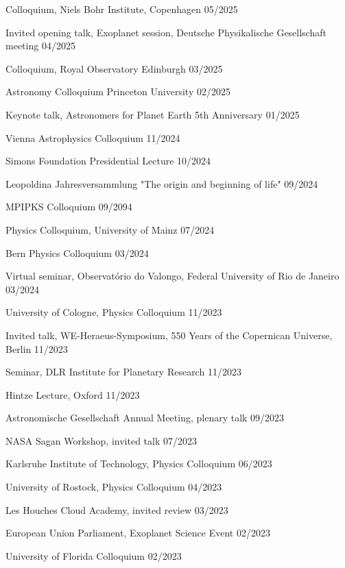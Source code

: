 \documentclass[12pt,letterpaper]{article}
\begin{document}
\begin{list}{}{\cvlist}
\item {Colloquium, Niels Bohr Institute, Copenhagen \hfill 05/2025}
\item {Invited opening talk, Exoplanet session, Deutsche Physikalische Gesellschaft meeting \hfill 04/2025}
\item {Colloquium, Royal Observatory Edinburgh \hfill 03/2025}
\item {Astronomy Colloquium Princeton University \hfill 02/2025}
\item {Keynote talk, Astronomers for Planet Earth 5th Anniversary \hfill 01/2025}
\item {Vienna Astrophysics Colloquium \hfill 11/2024}
\item {Simons Foundation Presidential Lecture \hfill 10/2024}
\item {Leopoldina Jahresversammlung "The origin and beginning of life" \hfill 09/2024}
\item {MPIPKS Colloquium \hfill 09/2094}
\item {Physics Colloquium, University of Mainz \hfill 07/2024}
\item {Bern Physics Colloquium \hfill 03/2024}
\item {Virtual seminar, Observatório do Valongo, Federal University of Rio de Janeiro \hfill 03/2024}
\item {University of Cologne, Physics Colloquium \hfill 11/2023}
\item {Invited talk, WE-Heraeus-Symposium, 550 Years of the Copernican Universe, Berlin \hfill 11/2023}
\item {Seminar, DLR Institute for Planetary Research \hfill 11/2023}
\item {Hintze Lecture, Oxford \hfill 11/2023}
\item {Astronomische Gesellschaft Annual Meeting, plenary talk \hfill 09/2023}
\item {NASA Sagan Workshop, invited talk \hfill 07/2023}
\item {Karlsruhe Institute of Technology, Physics Colloquium \hfill 06/2023}
\item {University of Rostock, Physics Colloquium \hfill 04/2023}
\item {Les Houches Cloud Academy, invited review \hfill 03/2023}
\item {European Union Parliament, Exoplanet Science Event \hfill 02/2023}
\item {University of Florida Colloquium \hfill 02/2023}

\end{list}
\end{document}
